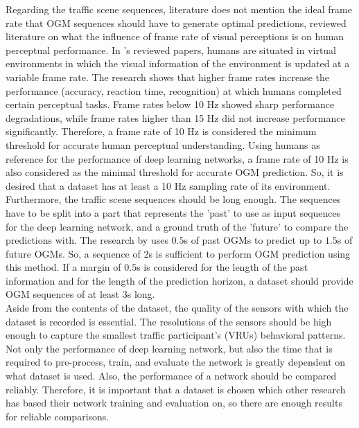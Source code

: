 Regarding the traffic scene sequences, literature does not mention the ideal frame rate that \gls{OGM} sequences should have to generate optimal predictions, \cite{chen2007review} reviewed literature on what the influence of frame rate of visual perceptions is on human perceptual performance. In \cite{chen2007review}'s reviewed papers, humans are situated in virtual environments in which the visual information of the environment is updated at a variable frame rate. The research shows that higher frame rates increase the performance (accuracy, reaction time, recognition) at which humans completed certain perceptual tasks. Frame rates below 10 Hz showed sharp performance degradations, while frame rates higher than 15 Hz did not increase performance significantly. Therefore, a frame rate of 10 Hz is considered the minimum threshold for accurate human perceptual understanding. Using humans as reference for the performance of deep learning networks, a frame rate of 10 Hz is also considered as the minimal threshold for accurate \gls{OGM} prediction. So, it is desired that a dataset has at least a 10 Hz sampling rate of its environment. Furthermore, the traffic scene sequences should be long enough. The sequences have to be split into a part that represents the 'past' to use as input sequences for the deep learning network, and a ground truth of the 'future' to compare the predictions with. The research by \cite{lange2020attention} uses $0.5$s of past \glspl{OGM} to predict up to $1.5$s of future \glspl{OGM}. So, a sequence of $2$s is sufficient to perform \gls{OGM} prediction using this method. If a margin of $0.5$s is considered for the length of the past information and for the length of the prediction horizon, a dataset should provide \gls{OGM} sequences of at least $3$s long. \\

Aside from the contents of the dataset, the quality of the sensors with which the dataset is recorded is essential. The resolutions of the sensors should be high enough to capture the smallest traffic participant's (\glspl{VRU}) behavioral patterns. Not only the performance of deep learning network, but also the time that is required to pre-process, train, and evaluate the network is greatly dependent on what dataset is used. Also, the performance of a network should be compared reliably. Therefore, it is important that a dataset is chosen which other research has based their network training and evaluation on, so there are enough results for reliable comparisons. \\

